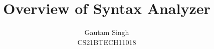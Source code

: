 \documentclass[journal,12pt,twocolumn]{IEEEtran}
\DeclareMathOperator*{\Res}{Res}
\begin{document}
\newtheorem{theorem}{Theorem}[section]
\newtheorem{problem}{Problem}
\newtheorem{proposition}{Proposition}[section]
\newtheorem{lemma}{Lemma}[section]
\newtheorem{corollary}[theorem]{Corollary}
\newtheorem{example}{Example}[section]
\newtheorem{definition}[problem]{Definition}
\newcommand{\BEQA}{\begin{eqnarray}}
\newcommand{\EEQA}{\end{eqnarray}}
\newcommand{\define}{\stackrel{\triangle}{=}}

\providecommand{\mbf}{\mathbf}
\providecommand{\pr}[1]{\ensuremath{\Pr\left(#1\right)}}
\providecommand{\qfunc}[1]{\ensuremath{Q\left(#1\right)}}
\providecommand{\sbrak}[1]{\ensuremath{{}\left[#1\right]}}
\providecommand{\lsbrak}[1]{\ensuremath{{}\left[#1\right.}}
\providecommand{\rsbrak}[1]{\ensuremath{{}\left.#1\right]}}
\providecommand{\brak}[1]{\ensuremath{\left(#1\right)}}
\providecommand{\lbrak}[1]{\ensuremath{\left(#1\right.}}
\providecommand{\rbrak}[1]{\ensuremath{\left.#1\right)}}
\providecommand{\cbrak}[1]{\ensuremath{\left\{#1\right\}}}
\providecommand{\lcbrak}[1]{\ensuremath{\left\{#1\right.}}
\providecommand{\rcbrak}[1]{\ensuremath{\left.#1\right\}}}
\theoremstyle{remark}
\newtheorem{rem}{Remark}
\newcommand{\sgn}{\mathop{\mathrm{sgn}}}
\providecommand{\abs}[1]{\left\vert#1\right\vert}
\providecommand{\res}[1]{\Res\displaylimits_{#1}} 
\providecommand{\norm}[1]{\left\lVert#1\right\rVert}
\providecommand{\mtx}[1]{\mathbf{#1}}
\providecommand{\mean}[1]{E\left[ #1 \right]}   
\providecommand{\fourier}{\overset{\mathcal{F}}{ \rightleftharpoons}}
\providecommand{\system}[1]{\overset{\mathcal{#1}}{ \longleftrightarrow}}
\newcommand{\solution}{\noindent \textbf{Solution: }}
\newcommand{\cosec}{\,\text{cosec}\,}
\providecommand{\dec}[2]{\ensuremath{\overset{#1}{\underset{#2}{\gtrless}}}}
\newcommand{\myvec}[1]{\ensuremath{\begin{pmatrix}#1\end{pmatrix}}}
\newcommand{\mydet}[1]{\ensuremath{\begin{vmatrix}#1\end{vmatrix}}}
\renewcommand{\vec}[1]{\boldsymbol{\mathbf{#1}}}
\def\putbox#1#2#3{\makebox[0in][l]{\makebox[#1][l]{}\raisebox{\baselineskip}[0in][0in]{\raisebox{#2}[0in][0in]{#3}}}}
     \def\rightbox#1{\makebox[0in][r]{#1}}
     \def\centbox#1{\makebox[0in]{#1}}
     \def\topbox#1{\raisebox{-\baselineskip}[0in][0in]{#1}}
     \def\midbox#1{\raisebox{-0.5\baselineskip}[0in][0in]{#1}}

\vspace{3cm}
\title{Overview of Syntax Analyzer}
\author{Gautam Singh\\CS21BTECH11018}
\maketitle
\tableofcontents
\bigskip
\end{document}
